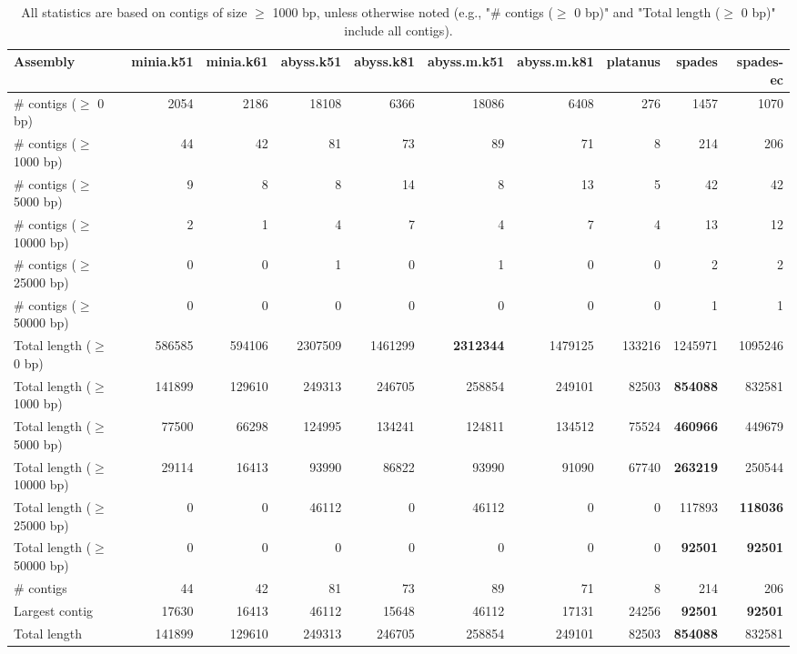 \documentclass[12pt,a4paper]{article}
\begin{document}
\begin{table}[ht]
\begin{center}
\caption{All statistics are based on contigs of size $\geq$ 1000 bp, unless otherwise noted (e.g., "\# contigs ($\geq$ 0 bp)" and "Total length ($\geq$ 0 bp)" include all contigs).}
\begin{tabular}{|l*{9}{|r}|}
\hline
Assembly & minia.k51 & minia.k61 & abyss.k51 & abyss.k81 & abyss.m.k51 & abyss.m.k81 & platanus & spades & spades-ec \\ \hline
\# contigs ($\geq$ 0 bp) & 2054 & 2186 & 18108 & 6366 & 18086 & 6408 & 276 & 1457 & 1070 \\ \hline
\# contigs ($\geq$ 1000 bp) & 44 & 42 & 81 & 73 & 89 & 71 & 8 & 214 & 206 \\ \hline
\# contigs ($\geq$ 5000 bp) & 9 & 8 & 8 & 14 & 8 & 13 & 5 & 42 & 42 \\ \hline
\# contigs ($\geq$ 10000 bp) & 2 & 1 & 4 & 7 & 4 & 7 & 4 & 13 & 12 \\ \hline
\# contigs ($\geq$ 25000 bp) & 0 & 0 & 1 & 0 & 1 & 0 & 0 & 2 & 2 \\ \hline
\# contigs ($\geq$ 50000 bp) & 0 & 0 & 0 & 0 & 0 & 0 & 0 & 1 & 1 \\ \hline
Total length ($\geq$ 0 bp) & 586585 & 594106 & 2307509 & 1461299 & {\bf 2312344} & 1479125 & 133216 & 1245971 & 1095246 \\ \hline
Total length ($\geq$ 1000 bp) & 141899 & 129610 & 249313 & 246705 & 258854 & 249101 & 82503 & {\bf 854088} & 832581 \\ \hline
Total length ($\geq$ 5000 bp) & 77500 & 66298 & 124995 & 134241 & 124811 & 134512 & 75524 & {\bf 460966} & 449679 \\ \hline
Total length ($\geq$ 10000 bp) & 29114 & 16413 & 93990 & 86822 & 93990 & 91090 & 67740 & {\bf 263219} & 250544 \\ \hline
Total length ($\geq$ 25000 bp) & 0 & 0 & 46112 & 0 & 46112 & 0 & 0 & 117893 & {\bf 118036} \\ \hline
Total length ($\geq$ 50000 bp) & 0 & 0 & 0 & 0 & 0 & 0 & 0 & {\bf 92501} & {\bf 92501} \\ \hline
\# contigs & 44 & 42 & 81 & 73 & 89 & 71 & 8 & 214 & 206 \\ \hline
Largest contig & 17630 & 16413 & 46112 & 15648 & 46112 & 17131 & 24256 & {\bf 92501} & {\bf 92501} \\ \hline
Total length & 141899 & 129610 & 249313 & 246705 & 258854 & 249101 & 82503 & {\bf 854088} & 832581 \\ \hline

\end{tabular}
\end{center}
\end{table}
\end{document}
